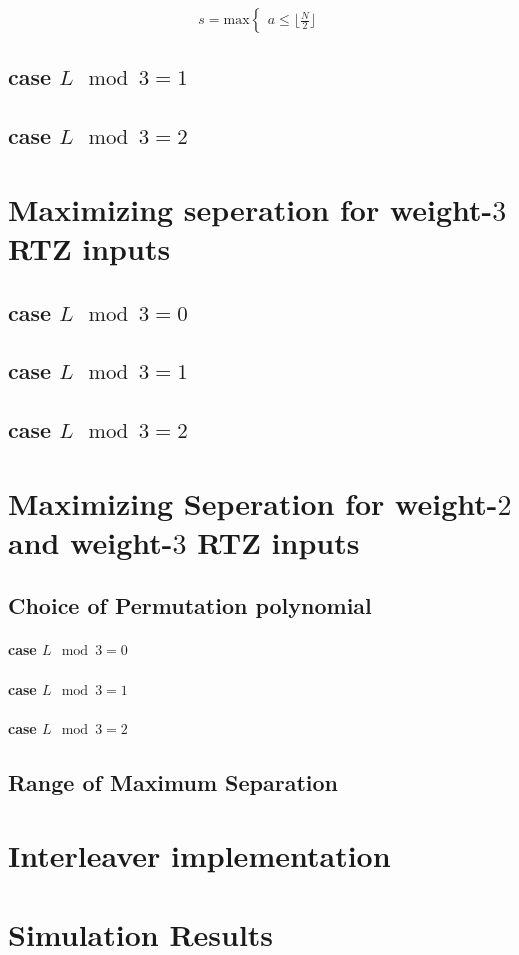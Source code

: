 \documentclass[11pt, oneside, dvipdfmx]{book}
\begin{document}
   $$s=\text{max} \begin{cases}
       a\leq\lfloor\frac{N}{2}\rfloor 
    \end{cases}
$$

\subsection{case $L \mod 3 =1$}

\subsection{case $L \mod 3 =2$}
\section{Maximizing seperation for weight-$3$ RTZ inputs}

\subsection{case $L \mod 3 =0$}

\subsection{case $L \mod 3 =1$}

\subsection{case $L \mod 3 =2$}

\section{Maximizing Seperation for weight-$2$  and weight-$3$ RTZ inputs}

\subsection{Choice of Permutation polynomial}
\paragraph{case $L \mod 3 =0$}

\paragraph{case $L \mod 3 =1$}

\paragraph{case $L \mod 3 =2$}

\subsection{Range of Maximum Separation}

\section{Interleaver implementation}

\section{Simulation Results}
 
\end{document}
